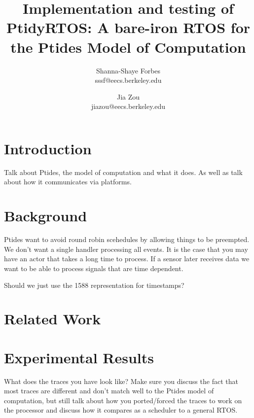 \documentclass{sig-alternate}
\begin{document}
\title{Implementation and testing of PtidyRTOS: A bare-iron RTOS for the Ptides Model of Computation}





\author{Shanna-Shaye Forbes\\
sssf@eecs.berkeley.edu\\
\and
Jia Zou\\
jiazou@eecs.berkeley.edu\\
}

\maketitle
\begin{abstract}

\end{abstract}

\section{Introduction}

Talk about Ptides, the model of computation and what it does. As well as talk about how it communicates via platforms.

\section{Background}

Ptides want to avoid round robin scehedules by allowing things to be preempted. We don't want a single handler processing all events. It is the case that you may have an actor that takes a long time to process. If a sensor later receives data we want to be able to process signals that are time dependent.

Should we just use the 1588 representation for timestamps?


\section{Related Work}

\section{Experimental Results}
What does the traces you have look like? Make sure you discuss the fact that most traces are different and don't match well to the Ptides model of computation, but still talk about how you ported/forced the traces to work on the processor and discuss how it compares as a scheduler to a general RTOS.
\end{document}
